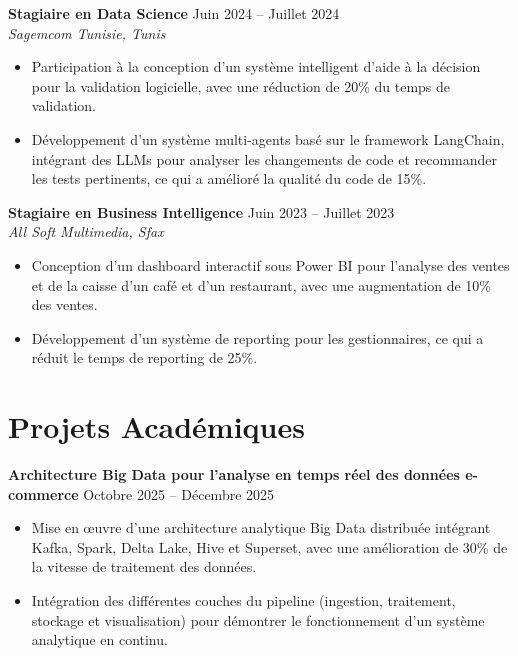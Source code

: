 \documentclass[9pt]{article}
\begin{document}
\textbf{Stagiaire en Data Science} \hfill Juin 2024 -- Juillet 2024 \\
\textit{\small Sagemcom Tunisie, Tunis} \vspace{-2mm}
\begin{itemize}[itemsep=-0.2em] 
    \item Participation à la conception d'un système intelligent d'aide à la décision pour la validation logicielle, avec une réduction de 20\% du temps de validation.
    \item Développement d'un système multi-agents basé sur le framework LangChain, intégrant des LLMs pour analyser les changements de code et recommander les tests pertinents, ce qui a amélioré la qualité du code de 15\%.
\end{itemize}
\vspace{1mm}

\textbf{Stagiaire en Business Intelligence} \hfill Juin 2023 -- Juillet 2023 \\
\textit{\small All Soft Multimedia, Sfax} \vspace{-2mm}
\begin{itemize}[itemsep=-0.2em] 
    \item Conception d'un dashboard interactif sous Power BI pour l'analyse des ventes et de la caisse d'un café et d'un restaurant, avec une augmentation de 10\% des ventes.
    \item Développement d'un système de reporting pour les gestionnaires, ce qui a réduit le temps de reporting de 25\%.
\end{itemize}
\vspace{1mm}

\section*{Projets Académiques}
\textbf{Architecture Big Data pour l'analyse en temps réel des données e-commerce} \hfill Octobre 2025 -- Décembre 2025
\begin{itemize}[itemsep=-0.2em]
    \item Mise en œuvre d'une architecture analytique Big Data distribuée intégrant Kafka, Spark, Delta Lake, Hive et Superset, avec une amélioration de 30\% de la vitesse de traitement des données.
    \item Intégration des différentes couches du pipeline (ingestion, traitement, stockage et visualisation) pour démontrer le fonctionnement d'un système analytique en continu.
\end{itemize}
\end{document}
